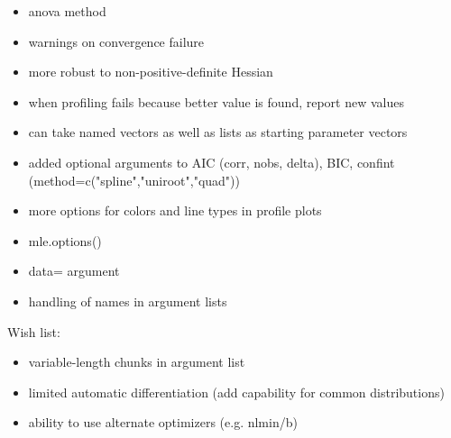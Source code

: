 \documentclass{article}
\begin{document}
\begin{itemize}
\item{anova method}
\item{warnings on convergence failure}
\item{more robust to non-positive-definite Hessian}
\item{when profiling fails because better value is
    found, report new values}
\item{can take named vectors as well as lists as
    starting parameter vectors}
\item{added optional arguments to AIC
    (corr, nobs, delta), BIC, confint 
    (method=c("spline","uniroot","quad"))}
\item{more options for colors and line types
    in profile plots}
\item{mle.options()}
\item{data= argument}
\item{handling of names in argument lists}
\end{itemize}

Wish list:
\begin{itemize}
\item{variable-length chunks in argument list}
\item{limited automatic differentiation
    (add capability for common distributions)}
\item{ability to use alternate optimizers (e.g. nlmin/b)}
\end{itemize}


\end{document}

